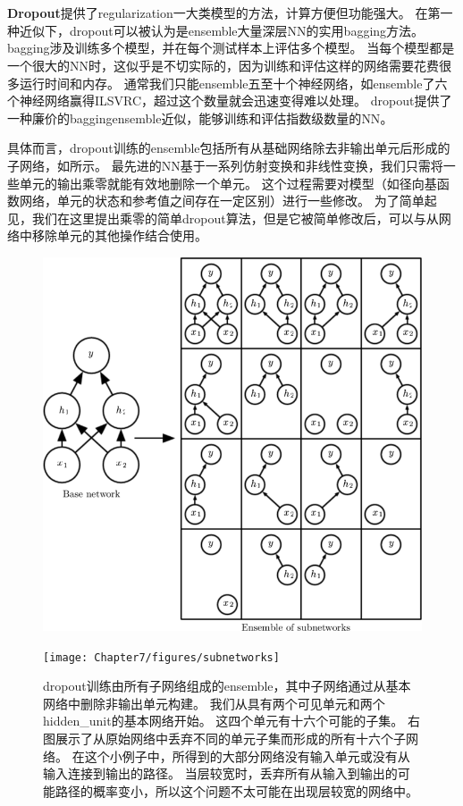 \section{}
\label{sec:dropout}
\textbf{Dropout}\citep{Srivastava-et-al-2014}提供了\gls{regularization}一大类模型的方法，计算方便但功能强大。
在第一种近似下，\gls{dropout}可以被认为是\gls{ensemble}大量深层\gls{NN}的实用\gls{bagging}方法。
\gls{bagging}涉及训练多个模型，并在每个测试样本上评估多个模型。
当每个模型都是一个很大的\gls{NN}时，这似乎是不切实际的，因为训练和评估这样的网络需要花费很多运行时间和内存。
通常我们只能\gls{ensemble}五至十个神经网络，如\cite{Szegedy-et-al-2014a}\gls{ensemble}了六个神经网络赢得ILSVRC，超过这个数量就会迅速变得难以处理。
\gls{dropout}提供了一种廉价的\gls{bagging}\gls{ensemble}近似，能够训练和评估指数级数量的\gls{NN}。

具体而言，\gls{dropout}训练的\gls{ensemble}包括所有从基础网络除去非输出单元后形成的子网络，如所示。
最先进的\gls{NN}基于一系列仿射变换和非线性变换，我们只需将一些单元的输出乘零就能有效地删除一个单元。
这个过程需要对模型（如径向基函数网络，单元的状态和参考值之间存在一定区别）进行一些修改。
为了简单起见，我们在这里提出乘零的简单\gls{dropout}算法，但是它被简单修改后，可以与从网络中移除单元的其他操作结合使用。
\begin{figure}[!htb]
\ifOpenSource
\centerline{\includegraphics[scale=0.5]{images/59.png}}
\else
\centerline{\texttt{[image: Chapter7/figures/subnetworks]}}
\fi
\caption{\gls{dropout}训练由所有子网络组成的\gls{ensemble}，其中子网络通过从基本网络中删除非输出单元构建。
我们从具有两个可见单元和两个\gls{hidden_unit}的基本网络开始。
这四个单元有十六个可能的子集。
右图展示了从原始网络中丢弃不同的单元子集而形成的所有十六个子网络。
在这个小例子中，所得到的大部分网络没有输入单元或没有从输入连接到输出的路径。
当层较宽时，丢弃所有从输入到输出的可能路径的概率变小，所以这个问题不太可能在出现层较宽的网络中。}
\label{fig:chap7_subnetworks}
\end{figure}


